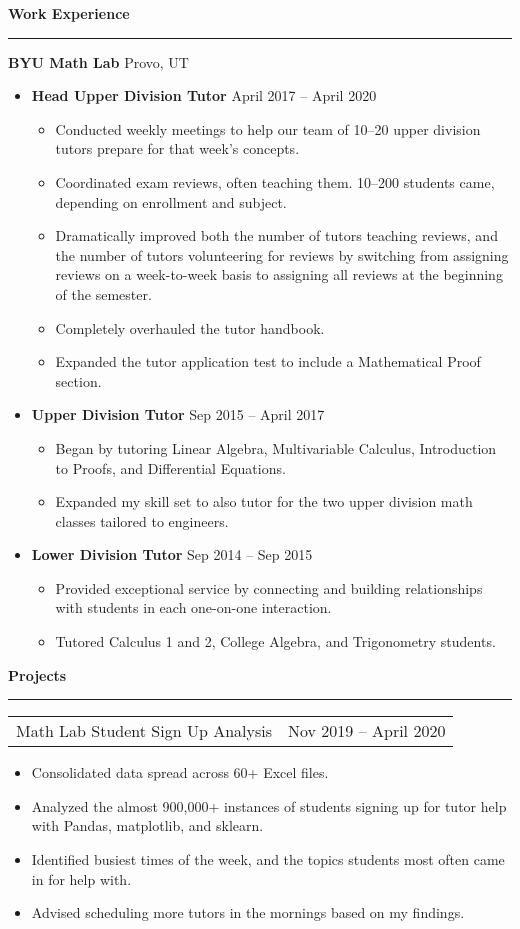 \documentclass{article}
\newenvironment{compactItemize}{
  \begin{itemize}[itemsep=0ex, parsep=0ex, partopsep=0ex, topsep= -7pt]
}{
  \end{itemize}
}
\newcommand{\project}[2]{
  \begingroup
  \setlength{\tabcolsep}{0ex}
  \begin{tabularx}{\linewidth}{X r}
    #1 & %
    #2\\ %
  \end{tabularx}%
  \endgroup%
}
\begin{document}
\bigskip
\textbf{Work Experience}
\smallskip
\hrule

\textbf{BYU Math Lab} Provo, UT
\begin{compactItemize}
  \item \textbf{Head Upper Division Tutor} April 2017 -- April 2020
    \begin{compactItemize}
      \item Conducted weekly meetings to help our team of 10--20 upper division tutors prepare for that week's concepts.
      \item Coordinated exam reviews, often teaching them.  10--200 students came, depending on enrollment and subject.
      \item Dramatically improved both the number of tutors teaching reviews, and the number of tutors volunteering for reviews
            by switching from assigning reviews on a week-to-week basis to assigning all reviews at the beginning of the semester.  
      \item Completely overhauled the tutor handbook.
      \item Expanded the tutor application test to include a Mathematical Proof section.
    \end{compactItemize}
  \item \textbf{Upper Division Tutor} Sep 2015 -- April 2017
    \begin{compactItemize}
      \item Began by tutoring Linear Algebra, Multivariable Calculus, Introduction to Proofs, and Differential Equations.
      \item Expanded my skill set to also tutor for the two upper division math classes tailored to engineers. 
    \end{compactItemize}
  \item \textbf{Lower Division Tutor} Sep 2014 -- Sep 2015
    \begin{compactItemize}
      \item Provided exceptional service by connecting and building relationships with students in each one-on-one interaction.
      \item Tutored Calculus 1 and 2, College Algebra, and Trigonometry students.
    \end{compactItemize}
\end{compactItemize}
\bigskip
\textbf{Projects %
}
\smallskip
\hrule

\project{Math Lab Student Sign Up Analysis}{Nov 2019 -- April 2020}
\begin{compactItemize}
  \item Consolidated data spread across 60+ Excel files.
  \item Analyzed the almost 900,000+ instances of students signing up for tutor help with Pandas, matplotlib, and sklearn.
  \item Identified busiest times of the week, and the topics students most often came in for help with.
  \item Advised scheduling more tutors in the mornings based on my findings.
\end{compactItemize}
\medskip
\end{document}
